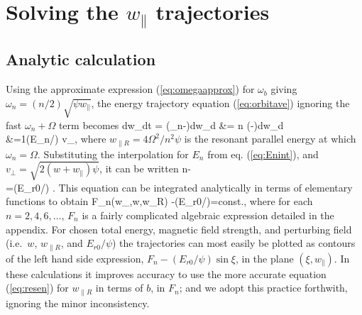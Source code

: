 \documentclass{agujournal2019}
\let\oldequation\equation
\let\oldendequation\endequation
\renewenvironment{equation}
  {\linenomathNonumbers\oldequation}
  {\oldendequation\endlinenomath}
\let\oldalign\align
\let\oldendalign\endalign
\renewenvironment{align}
  {\linenomathNonumbers\oldalign}
  {\oldendalign\endlinenomath}
\def\wp{w_\parallel}
\def\wr{w_{\parallel R}}
\begin{document}
\section{Solving the $\wp$ trajectories}

\subsection{Analytic calculation}

Using the approximate expression (\ref{eq:omegaapprox}) for $\omega_b$
giving $\omega_n=(n/2)\sqrt{\psi \wp}$, the energy trajectory
equation (\ref{eq:orbitave}) ignoring the fast $\omega_n+\Omega$ term becomes
\begin{align}
  \label{eq:combinedtraj}
  {d\wp \over dt}
  = (\omega_n-\Omega){d\wp \over d\xi}
  &=  {n\sqrt{\psi}} (\sqrt{\wp}-\sqrt{\wr }){d\wp \over d\xi}
\nonumber\\
  &={1}(E_n/\psi) v_\perp \cos\xi,
\end{align}
where $\wr =4\Omega^2/n^2\psi$ is the resonant parallel energy at which
$\omega_n=\Omega$. Substituting the interpolation for $E_n$ from
eq. (\ref{eq:Enint}), and $v_\perp=\sqrt{2(w+\wp)\psi}$, it can be written
\begin{align}
  \label{eq:combtraj1}
  n{\sqrt{\wp}-\sqrt{\wr }\over{} \sqrt{w+\wp}}
   \left[{n/2\over (1-\sqrt{\wp})^{n/2}} + 
     {\pi\over8}{1\over\sqrt{\wp}}\right]
   {d\wp \over d\xi}\nonumber\\
  =(E_{r0}/\psi) \cos\xi.
\end{align}
This equation can be integrated analytically in terms of elementary
functions to obtain
\begin{equation}
  \label{eq:w2solution}
  F_n(\wp,w,\wr ) -(E_{r0}/\psi)\sin\xi=const.,
\end{equation}
where for each $n=2,4,6,\dots$, $F_n$ is a fairly complicated
algebraic expression detailed in the appendix.  For chosen total
energy, magnetic field strength, and perturbing field (i.e.\ $w$,
$\wr $, and $E_{r0}/\psi$) the trajectories can most easily be plotted
as contours of the left hand side expression,
$F_n-(E_{r0}/\psi)\sin\xi$, in the plane $(\xi,\wp)$. In these
calculations it improves accuracy to use the more accurate equation
(\ref{eq:resen}) for $\wr$ in terms of $b$, in $F_n$; and we adopt
this practice forthwith, ignoring the minor inconsistency.
\end{document}
